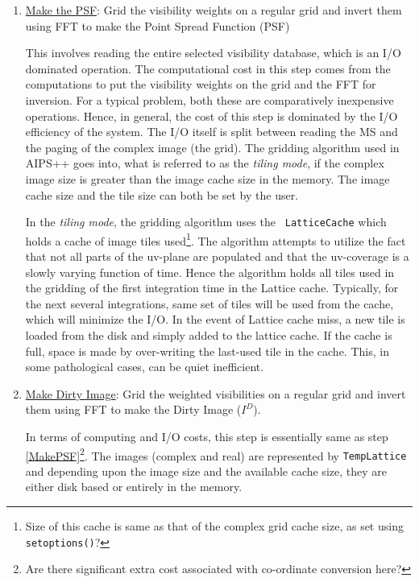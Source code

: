 \begin{enumerate}

\item \underline{Make the PSF}: Grid the visibility weights on a regular
grid and invert them using FFT to make the Point Spread Function (PSF)
\label{MakePSF}

This involves reading the entire selected visibility database, which
is an I/O dominated operation.  The computational cost in this step
comes from the computations to put the visibility weights on the grid
and the FFT for inversion.  For a typical problem, both these are
comparatively inexpensive operations.  Hence, in general, the cost of
this step is dominated by the I/O efficiency of the system.  The I/O
itself is split between reading the MS and the paging of the complex
image (the grid).  The gridding algorithm used in AIPS++ goes into,
what is referred to as the {\it tiling mode}, if the complex image
size is greater than the image cache size in the memory.  The image
cache size and the tile size can both be set by the user.

In the {\it tiling mode}, the gridding algorithm uses the {\tt
LatticeCache} which holds a cache of image tiles used\footnote{Size of
this cache is same as that of the complex grid cache size, as set
using {\tt setoptions()}?}.  The algorithm attempts to utilize the
fact that not all parts of the uv-plane are populated and that the
uv-coverage is a slowly varying function of time.  Hence the algorithm
holds all tiles used in the gridding of the first integration time in
the Lattice cache.  Typically, for the next several integrations,
same set of tiles will be used from the cache, which will minimize the
I/O.  In the event of Lattice cache miss, a new tile is loaded from
the disk and simply added to the lattice cache.  If the cache is full,
space is made by over-writing the last-used tile in the cache.  This,
in some pathological cases, can be quiet inefficient.


\item \underline{Make Dirty Image}: Grid the weighted visibilities on
      a regular grid and invert them using FFT to make the Dirty Image
      ($I^D$).
\label{MakeDI}

In terms of computing and I/O costs, this step is essentially same as
step \ref{MakePSF}\footnote{Are there significant extra cost
associated with co-ordinate conversion here?}.  The images (complex
and real) are represented by {\tt TempLattice} and depending upon the
image size and the available cache size, they are either disk based or
entirely in the memory.


\end{enumerate}
